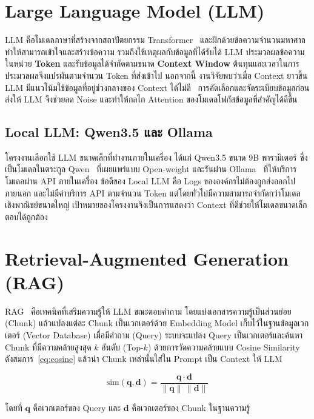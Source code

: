 \section{Large Language Model (LLM)}
LLM คือโมเดลภาษาที่สร้างจากสถาปัตยกรรม Transformer~\cite{vaswani2017attention}
และฝึกด้วยข้อความจำนวนมหาศาล ทำให้สามารถเข้าใจและสร้างข้อความ รวมถึงใช้เหตุผลกับข้อมูลที่ได้รับได้
LLM ประมวลผลข้อความในหน่วย \textbf{Token} และรับข้อมูลได้จำกัดตามขนาด \textbf{Context Window}
ต้นทุนและเวลาในการประมวลผลจึงแปรผันตามจำนวน Token ที่ส่งเข้าไป
นอกจากนี้ งานวิจัยพบว่าเมื่อ Context ยาวขึ้น LLM มีแนวโน้มใช้ข้อมูลที่อยู่ช่วงกลางของ Context ได้ไม่ดี~\cite{liu2024lost}
การคัดเลือกและจัดระเบียบข้อมูลก่อนส่งให้ LLM จึงช่วยลด Noise และทำให้กลไก Attention ของโมเดลโฟกัสข้อมูลที่สำคัญได้ดีขึ้น

\subsection{Local LLM: Qwen3.5 และ Ollama}
โครงงานเลือกใช้ LLM ขนาดเล็กที่ทำงานภายในเครื่อง ได้แก่ Qwen3.5 ขนาด 9B พารามิเตอร์
ซึ่งเป็นโมเดลในตระกูล Qwen~\cite{qwen3} ที่เผยแพร่แบบ Open-weight
และรันผ่าน Ollama~\cite{ollama} ที่ให้บริการโมเดลผ่าน API ภายในเครื่อง
ข้อดีของ Local LLM คือ Logs ขององค์กรไม่ต้องถูกส่งออกไปภายนอก และไม่มีค่าบริการ API ตามจำนวน Token
แต่โดยทั่วไปมีความสามารถจำกัดกว่าโมเดลเชิงพาณิชย์ขนาดใหญ่
เป้าหมายของโครงงานจึงเป็นการแสดงว่า Context ที่ดีช่วยให้โมเดลขนาดเล็กตอบได้ถูกต้อง

\section{Retrieval-Augmented Generation (RAG)}
RAG~\cite{lewis2020rag} คือเทคนิคที่เสริมความรู้ให้ LLM ขณะตอบคำถาม
โดยแบ่งเอกสารความรู้เป็นส่วนย่อย (Chunk) แล้วแปลงแต่ละ Chunk เป็นเวกเตอร์ด้วย Embedding Model
เก็บไว้ในฐานข้อมูลเวกเตอร์ (Vector Database)
เมื่อมีคำถาม (Query) ระบบจะแปลง Query เป็นเวกเตอร์และค้นหา Chunk ที่มีความคล้ายสูงสุด $k$ อันดับ (Top-$k$)
ด้วยการวัดความคล้ายแบบ Cosine Similarity ดังสมการ~\eqref{eq:cosine}
แล้วนำ Chunk เหล่านั้นใส่ใน Prompt เป็น Context ให้ LLM

\begin{equation}\label{eq:cosine}
\mathrm{sim}(\mathbf{q},\mathbf{d}) = \frac{\mathbf{q}\cdot\mathbf{d}}{\lVert\mathbf{q}\rVert\,\lVert\mathbf{d}\rVert}
\end{equation}

\noindent
โดยที่ $\mathbf{q}$ คือเวกเตอร์ของ Query และ $\mathbf{d}$ คือเวกเตอร์ของ Chunk ในฐานความรู้


